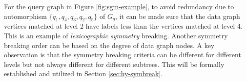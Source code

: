 For the query graph in Figure \ref{fig:sgm-example}, to avoid redundancy due to automorphism $\{q_1, q_4, q_3, q_2, q_5\}$ of $G_q$, it can be made sure that the data graph vertices matched at level 2 have labels less than the vertices matched at level 4. This is an example of \textit{lexicographic symmetry} breaking.
Another symmetry breaking order can be based on the degree of data graph nodes.
A key observation is that the symmetry breaking criteria can be different for different levels but not always different for different subtrees.
This will be formally established and utilized in Section \ref{sec:hy-symbreak}.




